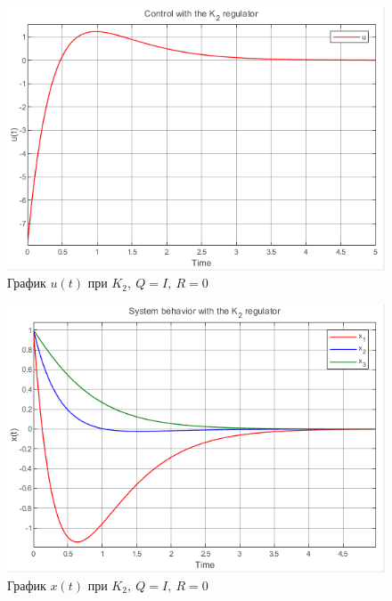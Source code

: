 \documentclass[a4paper, 12pt]{article}
\begin{document}
    \begin{figure}[H]
        \centering
        \includegraphics{3task_K2_u.png}
        \captionsetup{skip=0pt}
        \caption{График $u(t)$ при $K_2,\ Q=I,\ R=0$}
        \label{fig:3task_K2_u}
    \end{figure}
    \begin{figure}[H]
        \centering
        \includegraphics{3task_K2_x.png}
        \captionsetup{skip=0pt}
        \caption{График $x(t)$ при $K_{2},\ Q=I,\ R=0$}
        \label{fig:3task_K2_x}
    \end{figure}
    \newpage
    \vspace*{0.01mm}
\end{document}

